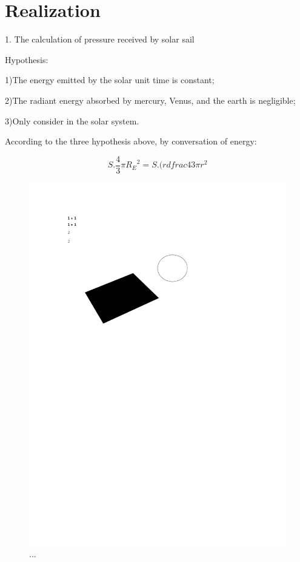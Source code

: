 \documentclass[../Paper.tex]{subfiles}
\begin{document}
\section{Realization}

1. The calculation of pressure received by solar sail  

Hypothesis:

1)The energy emitted by the solar unit time is constant; 

2)The radiant energy absorbed by mercury, Venus, and the earth is negligible; 

3)Only consider in the solar system. 

According to the three hypothesis above, by conversation of energy:

\[S.\dfrac{4}{3}\pi{R_E}^2=S.(rdfrac{4}{3}\pi r^2\]






\begin{figure}[H]
\centering
\includegraphics[width=12cm]{../Figures/1.pdf}
\caption{...}
\label{fig1}
\end{figure}
\end{document}
